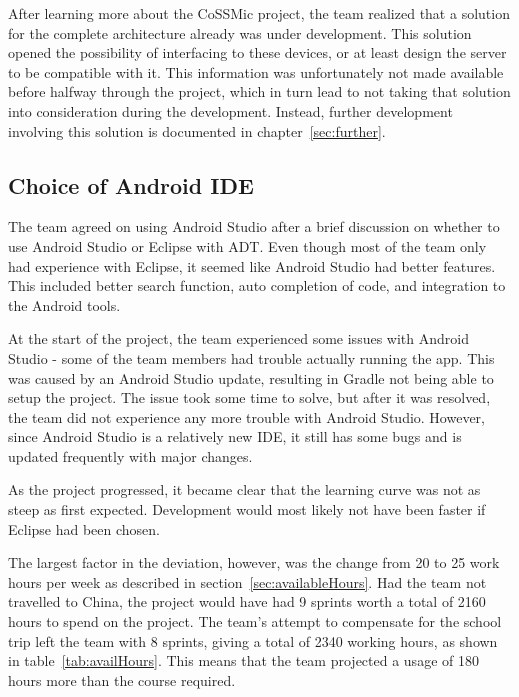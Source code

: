 After learning more about the CoSSMic project, the team realized that a solution for the complete architecture already was under development. This solution opened the possibility of interfacing to these devices, or at least design the server to be compatible with it. This information was unfortunately not made available before halfway through the project, which in turn lead to not taking that solution into consideration during the development. Instead, further development involving this solution is documented in chapter~\ref{sec:further}.

\subsection{Choice of Android IDE}
The team agreed on using Android Studio after a brief discussion on whether to use Android Studio or Eclipse with ADT. Even though most of the team only had experience with Eclipse, it seemed like Android Studio had better features. This included better search function, auto completion of code, and integration to the Android tools.
 
At the start of the project, the team experienced some issues with Android Studio - some of the team members had trouble actually running the app. This was caused by an Android Studio update, resulting in Gradle not being able to setup the project. The issue took some time to solve, but after it was resolved, the team did not experience any more trouble with Android Studio. However, since Android Studio is a relatively new IDE, it still has some bugs and is updated frequently with major changes.

As the project progressed, it became clear that the learning curve was not as steep as first expected. Development would most likely not have been faster if Eclipse had been chosen.



The largest factor in the deviation, however, was the change from 20 to 25 work hours per week as described in section~\ref{sec:availableHours}. Had the team not travelled to China, the project would have had 9 sprints worth a total of 2160 hours to spend on the project. The team's attempt to compensate for the school trip left the team with 8 sprints, giving a total of 2340 working hours, as shown in table~\ref{tab:availHours}. This means that the team projected a usage of 180 hours more than the course required.

